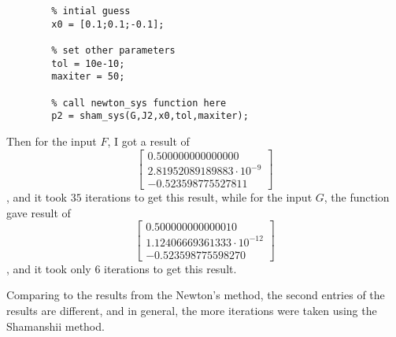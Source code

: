 \begin{answer}
\begin{verbatim}
        % intial guess
        x0 = [0.1;0.1;-0.1];
        
        % set other parameters
        tol = 10e-10;
        maxiter = 50;
        
        % call newton_sys function here
        p2 = sham_sys(G,J2,x0,tol,maxiter);
    \end{verbatim}
    Then for the input $F$, I got a result of
    \begin{equation}
        \left[\begin{matrix}
            0.500000000000000\\
            2.81952089189883\cdot 10^{-9}\\
            -0.523598775527811
        \end{matrix}\right]
    \end{equation}
    , and it took $35$ iterations to get this result, while for the input $G$, the function gave result of 
    \begin{equation}
        \left[\begin{matrix}
            0.500000000000010\\
            1.12406669361333\cdot 10^{-12}\\
            -0.523598775598270
        \end{matrix}\right]
    \end{equation}
    , and it took only $6$ iterations to get this result.
    
    Comparing to the results from the Newton's method, the second entries of the results are different, and in general, the more iterations were taken using the Shamanshii method.
\end{answer}